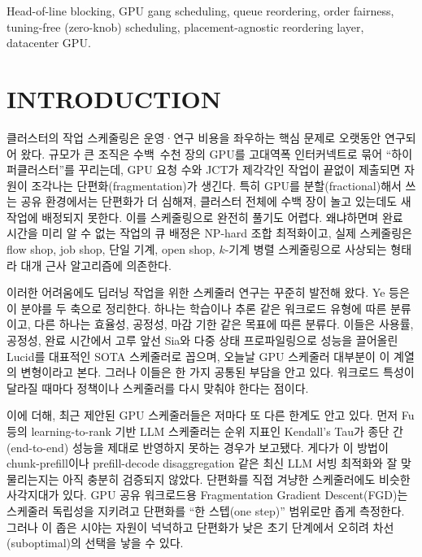 \documentclass{ieeetj}
\begin{document}
\begin{IEEEkeywords}
Head-of-line blocking, GPU gang scheduling, queue reordering, order fairness, tuning-free (zero-knob) scheduling, placement-agnostic reordering layer, datacenter GPU.
\end{IEEEkeywords}

\maketitle

\section{INTRODUCTION}\label{sec1}
 클러스터의 작업 스케줄링은 운영·연구 비용을 좌우하는 핵심 문제로 오랫동안 연구되어 왔다. 규모가 큰 조직은 수백~수천 장의 GPU를 고대역폭 인터커넥트로 묶어 ``하이퍼클러스터''를 꾸리는데, GPU 요청 수와 JCT가 제각각인 작업이 끝없이 제출되면 자원이 조각나는 단편화(fragmentation)가 생긴다\cite{athlur2022varuna}. 특히 GPU를 분할(fractional)해서 쓰는 공유 환경에서는 단편화가 더 심해져, 클러스터 전체에 수백 장이 놀고 있는데도 새 작업에 배정되지 못한다\cite{weng2023beware}. 이를 스케줄링으로 완전히 풀기도 어렵다. 왜냐하면며 완료 시간을 미리 알 수 없는 작업의 큐 배정은 NP-hard 조합 최적화이고\cite{ullman1975np}, 실제 스케줄링은 flow shop, job shop, 단일 기계, open shop, $k$-기계 병렬 스케줄링으로 사상되는 형태라\cite{b1} 대개 근사 알고리즘에 의존한다\cite{b2}.

이러한 어려움에도 딥러닝 작업을 위한 스케줄러 연구는 꾸준히 발전해 왔다. Ye 등\cite{b3}은 이 분야를 두 축으로 정리한다. 하나는 학습이나 추론 같은 워크로드 유형에 따른 분류이고, 다른 하나는 효율성, 공정성, 마감 기한 같은 목표에 따른 분류다. 이들은 사용률, 공정성, 완료 시간에서 고루 앞선 Sia\cite{b4}와 다중 상태 프로파일링으로 성능을 끌어올린 Lucid\cite{b5}를 대표적인 SOTA 스케줄러로 꼽으며, 오늘날 GPU 스케줄러 대부분이 이 계열의 변형이라고 본다. 그러나 이들은 한 가지 공통된 부담을 안고 있다. 워크로드 특성이 달라질 때마다 정책이나 스케줄러를 다시 맞춰야 한다는 점이다.

이에 더해, 최근 제안된 GPU 스케줄러들은 저마다 또 다른 한계도 안고 있다. 먼저 Fu 등\cite{fu2024efficient}의 learning-to-rank 기반 LLM 스케줄러는 순위 지표인 Kendall's Tau가 종단 간(end-to-end) 성능을 제대로 반영하지 못하는 경우가 보고됐다. 게다가 이 방법이 chunk-prefill이나 prefill-decode disaggregation 같은 최신 LLM 서빙 최적화와 잘 맞물리는지는 아직 충분히 검증되지 않았다\cite{fu2024efficient}. 단편화를 직접 겨냥한 스케줄러에도 비슷한 사각지대가 있다. GPU 공유 워크로드용 Fragmentation Gradient Descent(FGD)\cite{weng2023beware}는 스케줄러 독립성을 지키려고 단편화를 ``한 스텝(one step)'' 범위로만 좁게 측정한다. 그러나 이 좁은 시야는 자원이 넉넉하고 단편화가 낮은 초기 단계에서 오히려 차선(suboptimal)의 선택을 낳을 수 있다.
\end{document}
